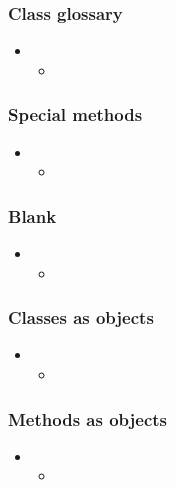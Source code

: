 \begin{frame}[fragile]
%
  \frametitle{Class glossary}
%
  \begin{itemize}
%
  \item 
    \begin{itemize}
    \item
    \end{itemize}
%
  \end{itemize}
%
\end{frame}

\begin{frame}[fragile]
%
  \frametitle{Special methods}
%
  \begin{itemize}
%
  \item 
    \begin{itemize}
    \item
    \end{itemize}
%
  \end{itemize}
%
\end{frame}

\begin{frame}[fragile]
%
  \frametitle{Blank}
%
  \begin{itemize}
%
  \item 
    \begin{itemize}
    \item
    \end{itemize}
%
  \end{itemize}
%
\end{frame}

\begin{frame}[fragile]
%
  \frametitle{Classes as objects}
%
  \begin{itemize}
%
  \item 
    \begin{itemize}
    \item
    \end{itemize}
%
  \end{itemize}
%
\end{frame}

\begin{frame}[fragile]
%
  \frametitle{Methods as objects}
%
  \begin{itemize}
%
  \item 
    \begin{itemize}
    \item
    \end{itemize}
%
  \end{itemize}
%
\end{frame}

